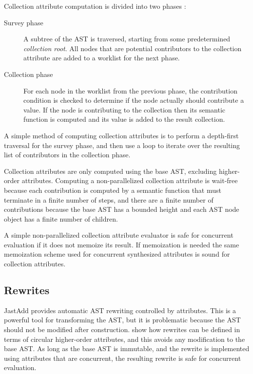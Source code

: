 {Collection attribute computation is divided into two phases \cite{DBLP:conf/scam/MagnussonEH07}:

\begin{description}
  \item[Survey phase] A subtree of the AST is traversed, starting from some predetermined
    \emph{collection root}.  All nodes that are potential contributors to the collection attribute
    are added to a worklist for the next phase.
  \item[Collection phase] For each node in the worklist from the previous phase,
    the contribution condition is checked to determine if the node actually should contribute
    a value. If the node is contributing to the collection then its semantic function is computed
    and its value is added to the result collection.
\end{description}

A simple method of computing collection attributes is to perform a depth-first traversal for the
survey phase, and then use a loop to iterate over the resulting list of contributors in the
collection phase.

Collection attributes are only computed using the base AST, excluding higher-order attributes.
Computing a non-parallelized collection attribute is wait-free because each contribution
is computed by a semantic function that must terminate in a finite number of steps, and
there are a finite number of contributions because the base AST has a bounded height
and each AST node object has a finite number of children.

A simple non-parallelized collection attribute evaluator is safe for concurrent evaluation
if it does not memoize its result. If memoization is needed the same memoization scheme used for
concurrent synthesized attributes is sound for collection attributes.


\subsection{Rewrites}
\label{rewrites}

JastAdd provides automatic AST rewriting controlled by attributes. This is a
powerful tool for transforming the AST, but it is problematic
because the AST should not be modified after construction.
\textcite{DBLP:journals/cl/SoderbergH15} show how rewrites can be defined in
terms of circular higher-order attributes, and this avoids any modification to
the base AST. As long as the base AST is immutable, and the rewrite is implemented using
attributes that are concurrent, the resulting rewrite is safe for concurrent evaluation.


}
